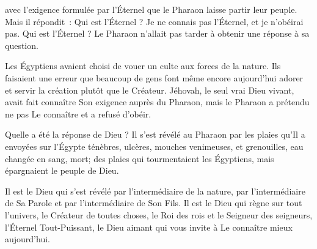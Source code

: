 \dvrule






 avec l'exigence formulée par l'Éternel que le Pharaon
 laisse partir leur peuple.
 Mais il répondit~: \og Qui est l'Éternel ? Je ne connais pas l'Éternel,
 et je n'obéirai pas. \fg{}
 Qui est l'Éternel ? Le Pharaon n'allait pas tarder
 à obtenir une réponse à sa question.

Les Égyptiens avaient choisi de vouer un culte aux forces de la nature.
 Ils faisaient une erreur que beaucoup de gens font même encore aujourd'hui
 \ocadr{}adorer et servir la création plutôt que le Créateur.
 Jéhovah, le seul vrai Dieu vivant, avait fait connaître Son exigence
 auprès du Pharaon, mais le Pharaon a prétendu
 ne pas Le connaître et a refusé d'obéir.

Quelle a été la réponse de Dieu ? Il s'est révélé au Pharaon
 par les plaies qu'Il a envoyées sur l'Égypte
 \ocadr{}ténèbres, ulcères, mouches venimeuses, et grenouilles,
 eau changée en sang, mort; des plaies qui tourmentaient les Égyptiens,
 mais épargnaient le peuple de Dieu.


Il est le Dieu qui s'est révélé par l'intermédiaire de la nature,
 par l'intermédiaire de Sa Parole et par l'intermédiaire de Son Fils.
 Il est le Dieu qui règne sur tout l'univers, le Créateur de toutes choses,
 le Roi des rois et le Seigneur des seigneurs,
 l'Éternel Tout-Puissant, le Dieu aimant
 qui vous invite à Le connaître mieux aujourd'hui. 

\dvrule

